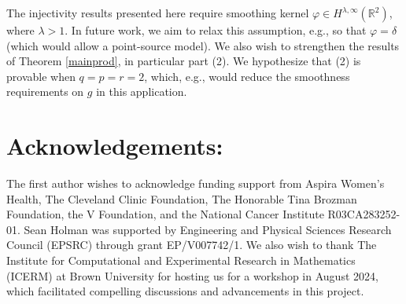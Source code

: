 \documentclass[a4paper,12pt]{amsart}
\numberwithin{equation}{section}
\theoremstyle{plain}
\numberwithin{theorem}{section}
\theoremstyle{definition}
\theoremstyle{remark}
\theoremstyle{remark}
\theoremstyle{remark}
\begin{document}
The injectivity results presented here require smoothing kernel $\varphi \in H^{\lambda,\infty}(\mathbb{R}^2)$, where $\lambda > 1$. In future work, we aim to relax this assumption, e.g., so that $\varphi = \delta$ (which would allow a point-source model). We also wish to strengthen the results of Theorem \ref{mainprod}, in particular part (2). We hypothesize that (2) is provable when $q = p = r = 2$, which, e.g., would reduce the smoothness requirements on $g$ in this application. 

\section*{Acknowledgements:} 
The first author wishes to acknowledge funding support from Aspira Women's Health, The Cleveland Clinic Foundation, The Honorable Tina Brozman Foundation, the V Foundation, and the National Cancer Institute R03CA283252-01. Sean Holman was supported by Engineering and Physical Sciences Research Council (EPSRC) through grant EP/V007742/1. We also wish to thank The Institute for Computational and Experimental Research in Mathematics (ICERM) at Brown University for hosting us for a workshop in August 2024, which facilitated compelling discussions and advancements in this project.

 



\appendix
\end{document}

